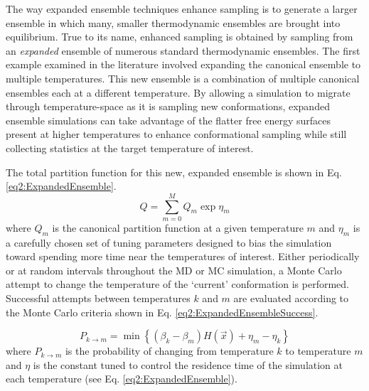 The way expanded ensemble techniques enhance sampling is to generate a larger
ensemble in which many, smaller thermodynamic ensembles are brought into
equilibrium. True to its name, enhanced sampling is obtained by sampling from an
\emph{expanded} ensemble of numerous standard thermodynamic ensembles. The first
example examined in the literature involved expanding the canonical ensemble to
multiple temperatures. \cite{Lyubartsev_JChemPhys_1992_v96_p1776} This new
ensemble is a combination of multiple canonical ensembles each at a different
temperature. By allowing a simulation to migrate through temperature-space as it
is sampling new conformations, expanded ensemble simulations can take advantage
of the flatter free energy surfaces present at higher temperatures to enhance
conformational sampling while still collecting statistics at the target
temperature of interest.

The total partition function for this new, expanded ensemble is shown in Eq.
\ref{eq2:ExpandedEnsemble}. \cite{Lyubartsev_JChemPhys_1992_v96_p1776}
\begin{equation}
   Q = \sum _ {m=0} ^ M Q_m \exp{\eta_m}
   \label{eq2:ExpandedEnsemble}
\end{equation}
where $Q_m$ is the canonical partition function at a given temperature $m$ and
$\eta_m$ is a carefully chosen set of tuning parameters designed to bias the
simulation toward spending more time near the temperatures of interest.
\cite{Lyubartsev_JChemPhys_1992_v96_p1776} Either periodically or at random
intervals throughout the MD or MC simulation, a Monte Carlo attempt to change
the temperature of the `current' conformation is performed. Successful attempts
between temperatures $k$ and $m$ are evaluated according to the Monte Carlo
criteria shown in Eq. \ref{eq2:ExpandedEnsembleSuccess}.

\begin{equation}
   P_{k \rightarrow m} = \min \left \lbrace \left( \beta _ k - \beta _ m \right)
         H(\vec{x}) + \eta _ m - \eta _ k \right \rbrace
   \label{eq2:ExpandedEnsembleSuccess}
\end{equation}
where $P_{k \rightarrow m}$ is the probability of changing from temperature $k$
to temperature $m$ and $\eta$ is the constant tuned to control the residence
time of the simulation at each temperature (see Eq. \ref{eq2:ExpandedEnsemble}).

